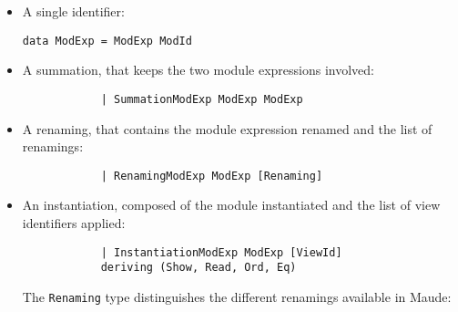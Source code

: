 \begin{itemize}
\item A single identifier:

{\codesize
\begin{verbatim}
data ModExp = ModExp ModId
\end{verbatim}
}

\item A summation, that keeps the two module
expressions involved:

{\codesize
\begin{verbatim}
            | SummationModExp ModExp ModExp
\end{verbatim}
}

\item A renaming, that contains the module expression renamed
and the list of renamings:

{\codesize
\begin{verbatim}
            | RenamingModExp ModExp [Renaming]
\end{verbatim}
}

\item An instantiation, composed of the module instantiated
and the list of view identifiers applied:

{\codesize
\begin{verbatim}
            | InstantiationModExp ModExp [ViewId]
            deriving (Show, Read, Ord, Eq)
\end{verbatim}
}

The \verb"Renaming" type distinguishes the different renamings
available in Maude:

\end{itemize}

